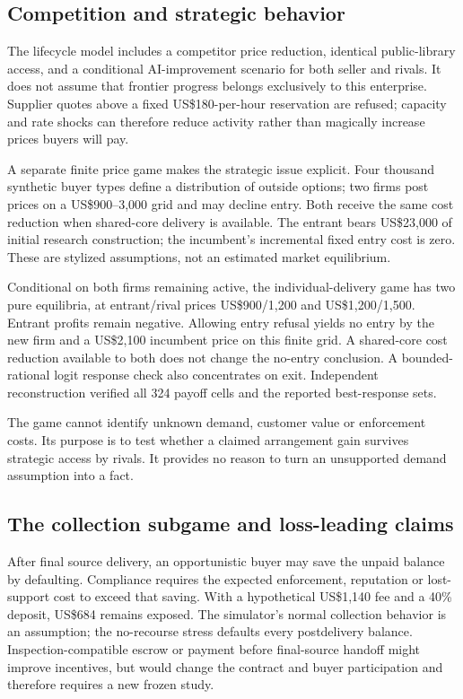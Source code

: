 \subsection{Competition and strategic behavior}
The lifecycle model includes a competitor price reduction, identical public-library access, and a conditional AI-improvement scenario for both seller and rivals. It does not assume that frontier progress belongs exclusively to this enterprise. Supplier quotes above a fixed US\$180-per-hour reservation are refused; capacity and rate shocks can therefore reduce activity rather than magically increase prices buyers will pay.

A separate finite price game makes the strategic issue explicit. Four thousand synthetic buyer types define a distribution of outside options; two firms post prices on a US\$900--3,000 grid and may decline entry. Both receive the same cost reduction when shared-core delivery is available. The entrant bears US\$23,000 of initial research construction; the incumbent's incremental fixed entry cost is zero. These are stylized assumptions, not an estimated market equilibrium.

Conditional on both firms remaining active, the individual-delivery game has two pure equilibria, at entrant/rival prices US\$900/1,200 and US\$1,200/1,500. Entrant profits remain negative. Allowing entry refusal yields no entry by the new firm and a US\$2,100 incumbent price on this finite grid. A shared-core cost reduction available to both does not change the no-entry conclusion. A bounded-rational logit response check also concentrates on exit. Independent reconstruction verified all 324 payoff cells and the reported best-response sets.

The game cannot identify unknown demand, customer value or enforcement costs. Its purpose is to test whether a claimed arrangement gain survives strategic access by rivals. It provides no reason to turn an unsupported demand assumption into a fact.

\subsection{The collection subgame and loss-leading claims}
After final source delivery, an opportunistic buyer may save the unpaid balance by defaulting. Compliance requires the expected enforcement, reputation or lost-support cost to exceed that saving. With a hypothetical US\$1,140 fee and a 40\% deposit, US\$684 remains exposed. The simulator's normal collection behavior is an assumption; the no-recourse stress defaults every postdelivery balance. Inspection-compatible escrow or payment before final-source handoff might improve incentives, but would change the contract and buyer participation and therefore requires a new frozen study.

